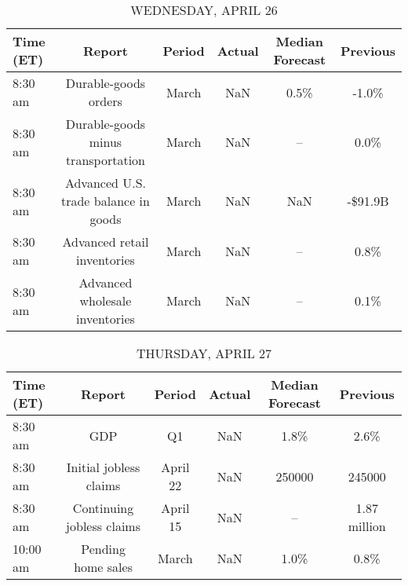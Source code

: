 \documentclass{article}%
\begin{document}
\begin{table}[htbp]%
\caption{WEDNESDAY, APRIL 26}%
\centering%
\begin{adjustbox}{width=1\textwidth}%
\begin{tabular}{lccccc}
\toprule
Time (ET) &                               Report & Period & Actual & Median Forecast & Previous \\
\midrule
  8:30 am &                 Durable-goods orders &  March &    NaN &            0.5\% &    -1.0\% \\
  8:30 am &   Durable-goods minus transportation &  March &    NaN &              -- &     0.0\% \\
  8:30 am & Advanced U.S. trade balance in goods &  March &    NaN &             NaN &  -\$91.9B \\
  8:30 am &          Advanced retail inventories &  March &    NaN &              -- &     0.8\% \\
  8:30 am &       Advanced wholesale inventories &  March &    NaN &              -- &     0.1\% \\
\bottomrule
\end{tabular}
%
\end{adjustbox}%
\end{table}

%


\begin{table}[htbp]%
\caption{THURSDAY, APRIL 27}%
\centering%
\begin{adjustbox}{width=1\textwidth}%
\begin{tabular}{lccccc}
\toprule
Time (ET) &                    Report &   Period & Actual & Median Forecast &     Previous \\
\midrule
  8:30 am &                       GDP &       Q1 &    NaN &            1.8\% &         2.6\% \\
  8:30 am &    Initial jobless claims & April 22 &    NaN &          250000 &       245000 \\
  8:30 am & Continuing jobless claims & April 15 &    NaN &              -- & 1.87 million \\
 10:00 am &        Pending home sales &    March &    NaN &            1.0\% &         0.8\% \\
\bottomrule
\end{tabular}
%
\end{adjustbox}%
\end{table}

%
\end{document}
